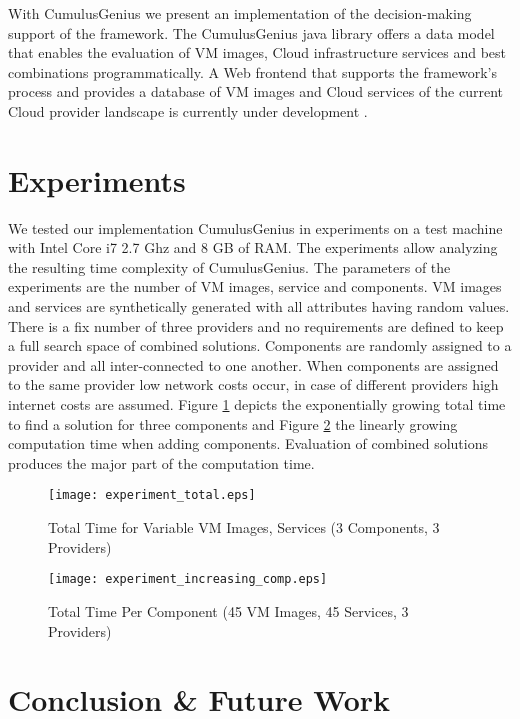 \documentclass[10pt]{article}
\begin{document}
With CumulusGenius \cite{cumulusgenius2011} we present an implementation of the decision-making support of the framework. The CumulusGenius java library offers a data model that enables the evaluation of VM images, Cloud infrastructure services and best combinations programmatically. A Web frontend that supports the framework's process and provides a database of VM images and Cloud services of the current Cloud provider landscape is currently under development \cite{cumulusgeniusonline2011}.

\section{Experiments}\label{experiments}

We tested our implementation CumulusGenius in experiments on a test machine with Intel Core i7 2.7 Ghz and 8 GB of RAM. The experiments allow analyzing the resulting time complexity of CumulusGenius. The parameters of the experiments are the number of VM images, service and components. VM images and services are synthetically generated with all attributes having random values. There is a fix number of three providers and no requirements are defined to keep a full search space of combined solutions. Components are randomly assigned to a provider and all inter-connected to one another. When components are assigned to the same provider low network costs occur, in case of different providers high internet costs are assumed. Figure \ref{experiments_total} depicts the exponentially growing total time to find a solution for three components and Figure \ref{experiments_incr_comp} the linearly growing computation time when adding components. Evaluation of combined solutions produces the major part of the computation time.

\begin{figure}[h]
\centering
\texttt{[image: experiment\_total.eps]} 
\caption{Total Time for Variable VM Images, Services (3 Components, 3 Providers)}\label{experiments_total}
\end{figure}

\begin{figure}[h]
\centering
\texttt{[image: experiment\_increasing\_comp.eps]} 
\caption{Total Time Per Component (45 VM Images, 45 Services, 3 Providers)}\label{experiments_incr_comp}
\end{figure}

\section{Conclusion \& Future Work}\label{discussion-future}
\end{document}
